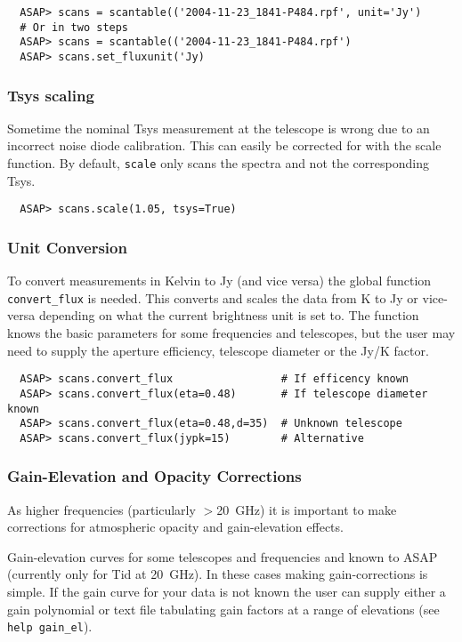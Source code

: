 \documentclass[11pt]{article}
\newcommand{\cmd}[1]{{\tt #1}}
\begin{document}
\begin{verbatim}
  ASAP> scans = scantable(('2004-11-23_1841-P484.rpf', unit='Jy')
  # Or in two steps
  ASAP> scans = scantable(('2004-11-23_1841-P484.rpf')
  ASAP> scans.set_fluxunit('Jy)
\end{verbatim}

\subsubsection{Tsys scaling}

Sometime the nominal Tsys measurement at the telescope is wrong due to
an incorrect noise diode calibration. This can easily be corrected for
with the scale function. By default, \cmd{scale} only scans the
spectra and not the corresponding Tsys.

\begin{verbatim}
  ASAP> scans.scale(1.05, tsys=True) 
\end{verbatim}

\subsubsection{Unit Conversion}

To convert measurements in Kelvin to Jy (and vice versa) the global
function \cmd{convert\_flux} is needed. This converts and scales the data
from K to Jy or vice-versa depending on what the current brightness unit is
set to. The function knows the basic parameters for some frequencies
and telescopes, but the user may need to supply the aperture
efficiency, telescope diameter or the Jy/K factor.

\begin{verbatim}
  ASAP> scans.convert_flux                 # If efficency known
  ASAP> scans.convert_flux(eta=0.48)       # If telescope diameter known
  ASAP> scans.convert_flux(eta=0.48,d=35)  # Unknown telescope
  ASAP> scans.convert_flux(jypk=15)        # Alternative
\end{verbatim}

\subsubsection{Gain-Elevation and Opacity Corrections}

As higher frequencies (particularly $>$20~GHz) it is important to make
corrections for atmospheric opacity and gain-elevation effects. 

Gain-elevation curves for some telescopes and frequencies and known to
ASAP (currently only for Tid at 20~GHz).  In these cases making
gain-corrections is simple.  If the gain curve for your data is not
known the user can supply either a gain polynomial or text file
tabulating gain factors at a range of elevations (see \cmd{help
gain\_el}). 
\end{document}
